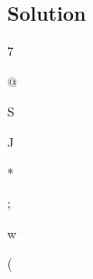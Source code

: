 \documentclass[a4paper, 11pt]{article}
\begin{document}
    \subsection{Solution}
      \begin{enumerate}[label=\alph*.]
        \begin{minipage}{0.45\textwidth}
          \item \begin{mdframed}[style=AnswerFrame]
            7
            \end{mdframed}
          \item \begin{mdframed}[style=AnswerFrame]
            @
            \end{mdframed}
        \end{minipage}\hfill
        \begin{minipage}{0.45\textwidth}
          \item \begin{mdframed}[style=AnswerFrame]
            S
            \end{mdframed}
          \item \begin{mdframed}[style=AnswerFrame]
            J
            \end{mdframed}
        \end{minipage}\hfill
        \begin{minipage}{0.45\textwidth}
          \item \begin{mdframed}[style=AnswerFrame]
            *
            \end{mdframed}
          \item \begin{mdframed}[style=AnswerFrame]
            ;
            \end{mdframed}
        \end{minipage}\hfill
        \begin{minipage}{0.45\textwidth}
          \item \begin{mdframed}[style=AnswerFrame]
            w
            \end{mdframed}
          \item \begin{mdframed}[style=AnswerFrame]
            (
            \end{mdframed}
        \end{minipage}
      \end{enumerate}
      
\end{document}
